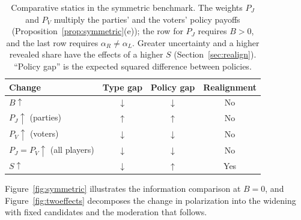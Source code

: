 \documentclass[12pt,letterpaper]{article}
\renewcommand{\arraystretch}{0.75}
\begin{document}
\begin{table}[H]
\centering
\small
\renewcommand{\arraystretch}{1.25}
\begin{tabular}{@{}lccc@{}}
\toprule
{\bfseries\boldmath Change} & {\bfseries\boldmath Type gap} & {\bfseries\boldmath Policy gap} & {\bfseries\boldmath Realignment} \\
\hline\hline
$B\uparrow$ & $\downarrow$ & $\downarrow$ & No \\ \midrule
$P_J\uparrow$ (parties) & $\uparrow$ & $\uparrow$ & No \\ \midrule
$P_V\uparrow$ (voters) & $\downarrow$ & $\downarrow$ & No \\ \midrule
$P_J=P_V\uparrow$ (all players) & $\downarrow$ & $\downarrow$ & No \\ \midrule
$S\uparrow$ & $\downarrow$ & $\uparrow$ & Yes \\
\bottomrule
\end{tabular}
\caption{Comparative statics in the symmetric benchmark. The weights $P_J$ and $P_V$ multiply the parties' and the voters' policy payoffs (Proposition~\ref{prop:symmetric}(e)); the row for $P_J$ requires $B>0$, and the last row requires $\alpha_R\ne\alpha_L$. Greater uncertainty and a higher revealed share have the effects of a higher $S$ (Section~\ref{sec:realign}). ``Policy gap'' is the expected squared difference between policies.}
\label{tab:benefit-comparison}
\end{table}

Figure~\ref{fig:symmetric} illustrates the information comparison at $B=0$, and Figure~\ref{fig:twoeffects} decomposes the change in polarization into the widening with fixed candidates and the moderation that follows.
\end{document}
